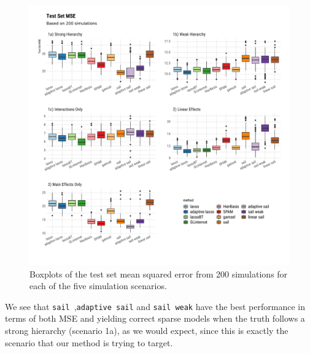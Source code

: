 \documentclass[12pt,letter]{article}\usepackage[]{graphicx}\usepackage[]{color}
\newenvironment{knitrout}{}{} %
\newcommand{\sail}{\texttt{sail}}
\begin{document}
\begin{knitrout}\scriptsize
{}\color{fgcolor}\begin{figure}[H]

{\centering \includegraphics[width=1\linewidth]{figure/plot-mse-sim-1} 

}

\caption[Boxplots of the test set mean squared error from 200 simulations for each of the five simulation scenarios]{Boxplots of the test set mean squared error from 200 simulations for each of the five simulation scenarios.}\label{fig:plot-mse-sim}
\end{figure}


\end{knitrout}

We see that \sail~,\texttt{adaptive sail} and \texttt{sail weak} have the best performance in terms of both MSE and yielding correct sparse models when the truth follows a strong hierarchy (scenario 1a), as we would expect, since this is exactly the scenario that our method is trying to target.
\end{document}

